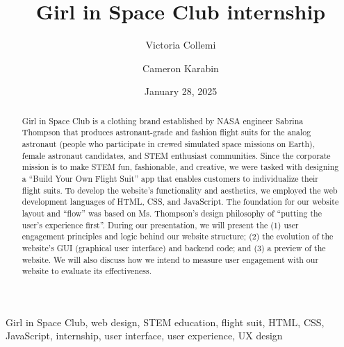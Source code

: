 \documentclass[12pt,conference,onecolumn]{IEEEtran}
\title{Girl in Space Club internship}
\author{Victoria Collemi \and Cameron Karabin}
\date{January 28, 2025}
\newcommand{\keywords}{Girl in Space Club, web design, STEM education, flight suit, HTML, CSS, JavaScript, internship, user interface, user experience, UX design}
\begin{document}
\maketitle 

\begin{abstract}
Girl in Space Club is a clothing brand established by NASA engineer Sabrina Thompson that produces astronaut-grade and fashion flight suits for the analog astronaut (people who participate in crewed simulated space missions on Earth), female astronaut candidates, and STEM enthusiast communities. Since the corporate mission is to make STEM fun, fashionable, and creative, we were tasked with designing a ``Build Your Own Flight Suit'' app that enables customers to individualize their flight suits. To develop the website's functionality and aesthetics, we employed the web development languages of HTML, CSS, and JavaScript. The foundation for our website layout and ``flow'' was based on Ms. Thompson’s design philosophy of ``putting the user’s experience first''. During our presentation, we will present the (1) user engagement principles and logic behind our website structure; (2) the evolution of the website's GUI (graphical user interface) and backend code; and (3) a preview of the website. We will also discuss how we intend to measure user engagement with our website to evaluate its effectiveness.
\end{abstract}

\begin{IEEEkeywords}
\keywords
\end{IEEEkeywords}
\end{document}
